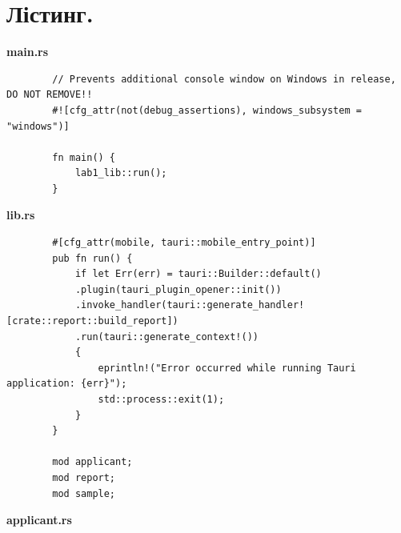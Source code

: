 \documentclass[14pt, a4paper]{extreport}
\begin{document}
	\pagebreak
	
	\section*{Лістинг.}
	
	\textbf{main.rs}
	
	\begin{verbatim} 
		// Prevents additional console window on Windows in release, DO NOT REMOVE!!
		#![cfg_attr(not(debug_assertions), windows_subsystem = "windows")]
		
		fn main() {
			lab1_lib::run();
		}
	\end{verbatim}
	
	\textbf{lib.rs}
	
	\begin{verbatim}
		#[cfg_attr(mobile, tauri::mobile_entry_point)]
		pub fn run() {
			if let Err(err) = tauri::Builder::default()
			.plugin(tauri_plugin_opener::init())
			.invoke_handler(tauri::generate_handler![crate::report::build_report])
			.run(tauri::generate_context!())
			{
				eprintln!("Error occurred while running Tauri application: {err}");
				std::process::exit(1);
			}
		}
		
		mod applicant;
		mod report;
		mod sample;
	\end{verbatim}
	
	\textbf{applicant.rs}
	
\end{document}
